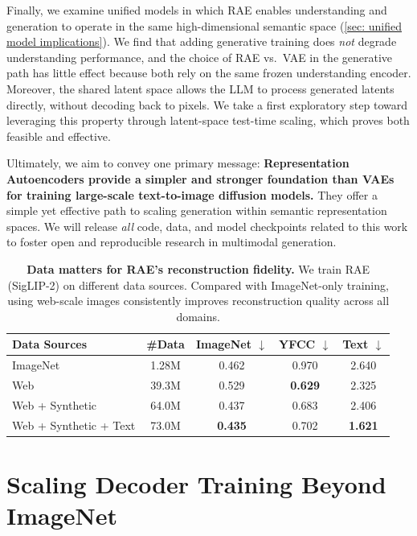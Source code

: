 \documentclass[10pt,twocolumn,letterpaper]{article}
\begin{document}
Finally, we examine unified models in which RAE enables understanding and generation to operate in the same high-dimensional semantic space (\cref{sec: unified model implications}). We find that adding generative training does \emph{not} degrade understanding performance, and the choice of RAE vs.\ VAE in the generative path has little effect because both rely on the same frozen understanding encoder.
Moreover, the shared latent space allows the LLM to process generated latents directly, without decoding back to pixels. We take a first exploratory step toward leveraging this property through latent-space test-time scaling, which proves both feasible and effective.

Ultimately, we aim to convey one primary message:
\textbf{Representation Autoencoders provide a simpler and stronger foundation than VAEs for training large-scale text-to-image diffusion models.} 
They offer a simple yet effective path to scaling generation within semantic representation spaces. 
We will release \emph{all} code, data, and model checkpoints related to this work to foster open and reproducible research in multimodal generation.




\begin{table}[t]
    \centering
    \small
    \caption{
        \textbf{Data matters for RAE's reconstruction fidelity.}
        We train RAE (SigLIP-2) on different data sources. Compared with ImageNet-only training, using web-scale images consistently improves reconstruction quality across all domains.
    }\label{tab:rfid_vs_data}
    \setlength{\tabcolsep}{2.9pt}
    \begin{tabular}{lcccc}
        \toprule
        \textbf{Data Sources} & \textbf{\#Data} &\textbf{ImageNet} $\downarrow$ & \textbf{YFCC} $\downarrow$ & \textbf{Text} $\downarrow$ \\
        \midrule
        \rowcolor{gray!10}
        ImageNet  & 1.28M &0.462 & 0.970 & 2.640 \\
        \midrule
        Web & 39.3M  & 0.529 &\textbf{0.629} & 2.325 \\
        Web + Synthetic &64.0M & 0.437 & 0.683 & 2.406 \\
        \rowcolor{green!10}
        Web + Synthetic + Text& 73.0M & \textbf{0.435} &0.702 & \textbf{1.621} \\
        \bottomrule
    \end{tabular}
\end{table}

\section{Scaling Decoder Training Beyond ImageNet}\label{sec: scale decoder}
\end{document}

